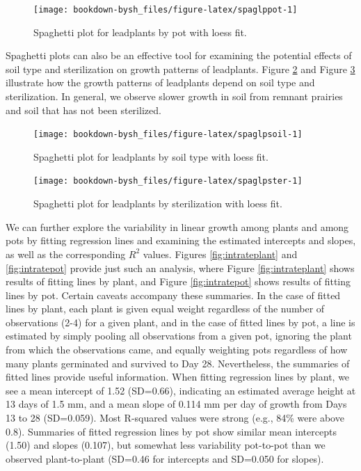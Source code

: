 \documentclass[
]{krantz}
\begin{document}
\begin{figure}

{\centering \texttt{[image: bookdown-bysh\_files/figure-latex/spaglppot-1]} 

}

\caption{Spaghetti plot for leadplants by pot with loess fit.}\label{fig:spaglppot}
\end{figure}

Spaghetti plots can also be an effective tool for examining the potential effects of soil type and sterilization on growth patterns of leadplants. Figure \ref{fig:spaglpsoil} and Figure \ref{fig:spaglpster} illustrate how the growth patterns of leadplants depend on soil type and sterilization. In general, we observe slower growth in soil from remnant prairies and soil that has not been sterilized.

\begin{figure}

{\centering \texttt{[image: bookdown-bysh\_files/figure-latex/spaglpsoil-1]} 

}

\caption{Spaghetti plot for leadplants by soil type with loess fit.}\label{fig:spaglpsoil}
\end{figure}

\begin{figure}

{\centering \texttt{[image: bookdown-bysh\_files/figure-latex/spaglpster-1]} 

}

\caption{Spaghetti plot for leadplants by sterilization with loess fit.}\label{fig:spaglpster}
\end{figure}

We can further explore the variability in linear growth among plants and among pots by fitting regression lines and examining the estimated intercepts and slopes, as well as the corresponding \(R^2\) values. Figures \ref{fig:intrateplant} and \ref{fig:intratepot} provide just such an analysis, where Figure \ref{fig:intrateplant} shows results of fitting lines by plant, and Figure \ref{fig:intratepot} shows results of fitting lines by pot. Certain caveats accompany these summaries. In the case of fitted lines by plant, each plant is given equal weight regardless of the number of observations (2-4) for a given plant, and in the case of fitted lines by pot, a line is estimated by simply pooling all observations from a given pot, ignoring the plant from which the observations came, and equally weighting pots regardless of how many plants germinated and survived to Day 28. Nevertheless, the summaries of fitted lines provide useful information. When fitting regression lines by plant, we see a mean intercept of 1.52 (SD=0.66), indicating an estimated average height at 13 days of 1.5 mm, and a mean slope of 0.114 mm per day of growth from Days 13 to 28 (SD=0.059). Most R-squared values were strong (e.g., 84\% were above 0.8). Summaries of fitted regression lines by pot show similar mean intercepts (1.50) and slopes (0.107), but somewhat less variability pot-to-pot than we observed plant-to-plant (SD=0.46 for intercepts and SD=0.050 for slopes).
\end{document}
